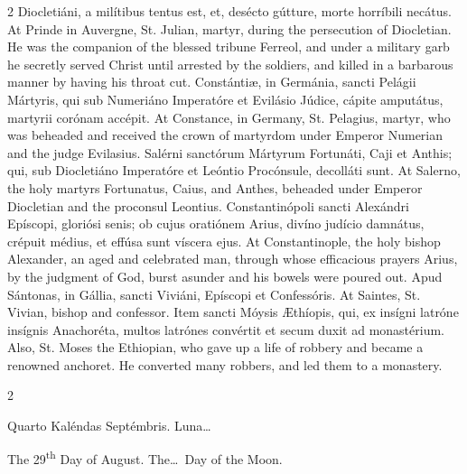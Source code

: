 \begin{paracol}{2}
 Diocletiáni, a milítibus tentus est, et, desécto gútture, morte horríbili 
 necátus.
\switchcolumn
{}
At Prinde in Auvergne, St. Julian, 
 martyr, during the persecution of Diocletian. He was the companion of 
 the blessed tribune Ferreol, and under a military garb he secretly served 
 Christ until arrested by the soldiers, and killed in a barbarous manner by 
 having his throat cut.
\switchcolumn*
{}
Constántiæ, in Germánia, sancti Pelágii Mártyris, qui sub Numeriáno Imperatóre et Evilásio Júdice, 
 cápite amputátus, martyrii corónam accépit.
\switchcolumn
{}
At Constance, in Germany, St. 
 Pelagius, martyr, who was beheaded and received the crown of martyrdom under Emperor Numerian 
 and the judge Evilasius.
\switchcolumn*
{}
Salérni sanctórum 
 Mártyrum Fortunáti, Caji et Anthis; qui, sub Diocletiáno Imperatóre et 
 Leóntio Procónsule, decolláti sunt.
\switchcolumn
{}
At Salerno, the holy martyrs 
 Fortunatus, Caius, and Anthes, beheaded under Emperor Diocletian and the 
 proconsul Leontius.
\switchcolumn*
{}
Constantinópoli sancti 
 Alexándri Epíscopi, gloriósi senis; ob cujus oratiónem Arius, divíno judício 
 damnátus, crépuit médius, et effúsa sunt víscera ejus.
\switchcolumn
{}
At Constantinople, the holy bishop 
 Alexander, an aged and celebrated man, through whose efficacious prayers 
 Arius, by the judgment of God, burst asunder and his bowels were poured 
 out.
\switchcolumn*
{}
Apud Sántonas, in 
 Gállia, sancti Viviáni, Epíscopi et Confessóris.
\switchcolumn
{}
At Saintes, St. Vivian, bishop and 
 confessor.
\switchcolumn*
{}
Item sancti Móysis 
 Æthíopis, qui, ex insígni latróne insígnis Anachoréta, multos latrónes 
 convértit et secum duxit ad monastérium.
\switchcolumn
{}
Also, St. Moses the Ethiopian, who gave up a life of 
 robbery and became a renowned anchoret. He converted many robbers, and 
 led them to a monastery.
\switchcolumn*
{}
\end{paracol}


\begin{paracol}{2}
\begin{center}{\color{gregoriocolor} Quarto Kaléndas Septémbris. 
 Luna\dots\ }\end{center}
\switchcolumn
{}
\begin{center}{\color{gregoriocolor} The 
 29\textsuperscript{th} Day of 
 August. The\dots\ Day of the Moon.}\end{center}
\end{paracol}


